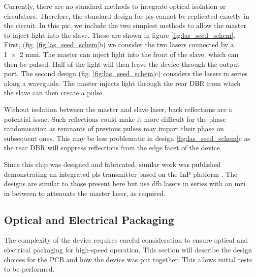 
Currently, there are no standard methods to integrate optical isolation or circulators. Therefore, the standard design for \ac{pls} cannot be replicated exactly in the circuit. In this \ac{pic}, we include the two simplest methods to allow the master to inject light into the slave. These are shown in figure \ref{fig:las_seed_schem}. First, (fig. \ref{fig:las_seed_schem}b) we consider the two lasers connected by a \num{1x2} \ac{mmi}. The master can inject light into the front of the slave, which can then be pulsed. Half of the light will then leave the device through the output port. The second design (fig. \ref{fig:las_seed_schem}c) considers the lasers in series along a waveguide. The master injects light through the rear \ac{DBR} from which the slave can then create a pulse. 

Without isolation between the master and slave laser, back reflections are a potential issue. Such reflections could make it more difficult for the phase randomisation as remnants of previous pulses may impart their phase on subsequent ones. This may be less problematic in design \ref{fig:las_seed_schem}c as the rear \ac{DBR} will suppress reflections from the edge facet of the device. 



Since this chip was designed and fabricated, similar work was published demonstrating an integrated \ac{pls} transmitter based on the \ac{InP} platform \cite{paraiso2019}. The designs are similar to those present here but use \ac{dfb} lasers in series with an \ac{mzi} in between to attenuate the master laser, as required. 

\subsection{Optical and Electrical Packaging}

The complexity of the device requires careful consideration to ensure optical and electrical packaging for high-speed operation. This section will describe the design choices for the PCB and how the device was put together. This allows initial tests to be performed.

